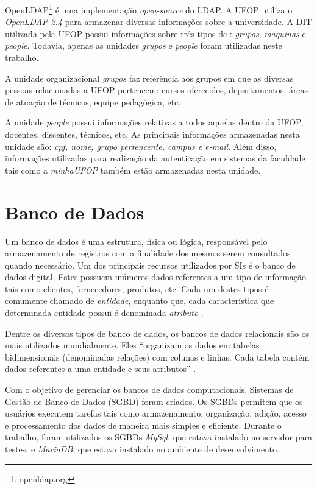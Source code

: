 \documentclass[
  12pt,       %
  openright,      %
  oneside,      %
  a4paper,      %
  english,      %
  french,        %
  spanish,     %
  brazil        %
  ]{abntex2-decsi}
\begin{document}
        OpenLDAP\footnote{openldap.org} é uma implementação \textit{open-source} do LDAP. A UFOP utiliza o \textit{OpenLDAP 2.4} para armazenar diversas informações sobre a universidade. A DIT utilizada pela UFOP possui informações sobre três tipos de : \textit{grupos}, \textit{maquinas} e \textit{people}. Todavia, apenas as unidades \textit{grupos} e \textit{people} foram utilizadas neste trabalho.

        A unidade organizacional \textit{grupos} faz referência aos grupos em que as diversas pessoas relacionadas a UFOP pertencem: cursos oferecidos, departamentos, áreas de atuação de técnicos, equipe pedagógica, etc. 

        A unidade \textit{people} possui informações relativas a todos aquelas dentro da UFOP, docentes, discentes, técnicos, etc. As principais informações armazenadas nesta unidade são: \textit{cpf, nome, grupo pertencente, campus e e-mail}. Além disso, informações utilizadas para realização da autenticação em sistemas da faculdade tais como a \textit{minhaUFOP} também estão armazenadas nesta unidade.

    \section{Banco de Dados}
   
   Um banco de dados é uma estrutura, física ou lógica, responsável pelo armazenamento de registros com a finalidade dos mesmos serem consultados quando necessário. Um dos principais recursos utilizados por SIs é o banco de dados digital. Estes possuem inúmeros dados referentes a um tipo de informação tais como clientes, fornecedores, produtos, etc. Cada um destes tipos é comumente chamado de \textit{entidade}, enquanto que, cada característica que determinada entidade possui é denominada \textit{atributo} \cite[p. 145]{laudon:2010}.
   
	Dentre os diversos tipos de banco de dados, os bancos de dados relacionais são os mais utilizados mundialmente. Eles ``organizam os dados em tabelas bidimensionais (denominadas relações) com colunas e linhas. Cada tabela contém dados referentes a uma entidade e seus atributos'' \cite[p. 145]{laudon:2010}. 

	Com o objetivo de gerenciar os bancos de dados computacionais, Sistemas de Gestão de Banco de Dados (SGBD) foram criados. Os SGBDs permitem que os usuários executem tarefas tais como armazenamento, organização, adição, acesso e processamento dos dados de maneira mais simples e eficiente. Durante o trabalho, foram utilizados os SGBDs \textit{MySql}, que estava instalado no servidor para testes, e \textit{MariaDB}, que estava instalado no ambiente de desenvolvimento.  
   
\end{document}
